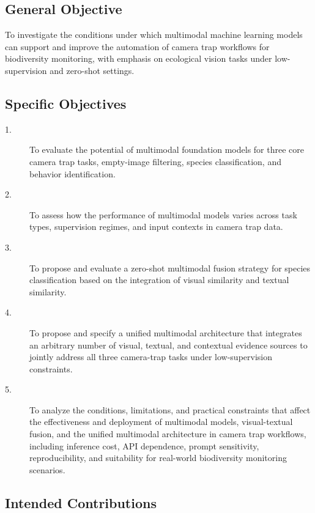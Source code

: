 \subsection{General Objective}

To investigate the conditions under which multimodal machine learning models can support and improve the automation of camera trap workflows for biodiversity monitoring, with emphasis on ecological vision tasks under low-supervision and zero-shot settings.

\subsection{Specific Objectives}

\begin{description}

\item[1.] To evaluate the potential of multimodal foundation models for three core camera trap tasks, empty-image filtering, species classification, and behavior identification.

\item[2.] To assess how the performance of multimodal models varies across task types, supervision regimes, and input contexts in camera trap data.

\item[3.] To propose and evaluate a zero-shot multimodal fusion strategy for species classification based on the integration of visual similarity and textual similarity.

\item[4.] To propose and specify a unified multimodal architecture that integrates an arbitrary number of visual, textual, and contextual evidence sources to jointly address all three camera-trap tasks under low-supervision constraints. 

\item[5.] To analyze the conditions, limitations, and practical constraints that affect the effectiveness and deployment of multimodal models, visual-textual fusion, and the unified multimodal architecture in camera trap workflows, including inference cost, API dependence, prompt sensitivity, reproducibility, and suitability for real-world biodiversity monitoring scenarios.

\end{description}

\subsection{Intended Contributions}

